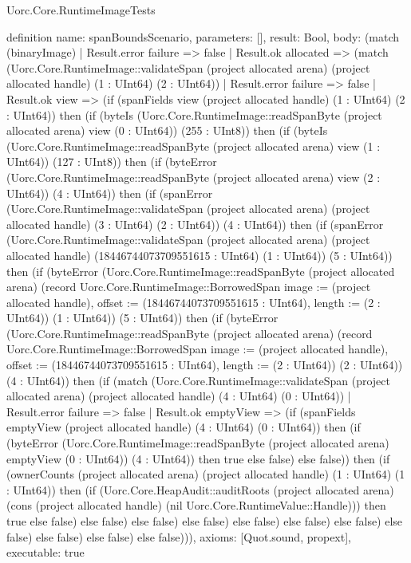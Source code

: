\begin{lexlean}{Uorc.Core.RuntimeImageTests}
\begin{semanticmodule}
definition{
  name: spanBoundsScenario,
  parameters: [],
  result: Bool,
  body: (match (binaryImage)
    | Result.error failure => false
    | Result.ok allocated => (match (Uorc.Core.RuntimeImage::validateSpan (project allocated arena) (project allocated handle) (1 : UInt64) (2 : UInt64))
      | Result.error failure => false
      | Result.ok view => (if (spanFields view (project allocated handle) (1 : UInt64) (2 : UInt64)) then (if (byteIs (Uorc.Core.RuntimeImage::readSpanByte (project allocated arena) view (0 : UInt64)) (255 : UInt8)) then (if (byteIs (Uorc.Core.RuntimeImage::readSpanByte (project allocated arena) view (1 : UInt64)) (127 : UInt8)) then (if (byteError (Uorc.Core.RuntimeImage::readSpanByte (project allocated arena) view (2 : UInt64)) (4 : UInt64)) then (if (spanError (Uorc.Core.RuntimeImage::validateSpan (project allocated arena) (project allocated handle) (3 : UInt64) (2 : UInt64)) (4 : UInt64)) then (if (spanError (Uorc.Core.RuntimeImage::validateSpan (project allocated arena) (project allocated handle) (18446744073709551615 : UInt64) (1 : UInt64)) (5 : UInt64)) then (if (byteError (Uorc.Core.RuntimeImage::readSpanByte (project allocated arena) (record Uorc.Core.RuntimeImage::BorrowedSpan {image := (project allocated handle), offset := (18446744073709551615 : UInt64), length := (2 : UInt64)}) (1 : UInt64)) (5 : UInt64)) then (if (byteError (Uorc.Core.RuntimeImage::readSpanByte (project allocated arena) (record Uorc.Core.RuntimeImage::BorrowedSpan {image := (project allocated handle), offset := (18446744073709551615 : UInt64), length := (2 : UInt64)}) (2 : UInt64)) (4 : UInt64)) then (if (match (Uorc.Core.RuntimeImage::validateSpan (project allocated arena) (project allocated handle) (4 : UInt64) (0 : UInt64))
        | Result.error failure => false
        | Result.ok emptyView => (if (spanFields emptyView (project allocated handle) (4 : UInt64) (0 : UInt64)) then (if (byteError (Uorc.Core.RuntimeImage::readSpanByte (project allocated arena) emptyView (0 : UInt64)) (4 : UInt64)) then true else false) else false)) then (if (ownerCounts (project allocated arena) (project allocated handle) (1 : UInt64) (1 : UInt64)) then (if (Uorc.Core.HeapAudit::auditRoots (project allocated arena) (cons (project allocated handle) (nil Uorc.Core.RuntimeValue::Handle))) then true else false) else false) else false) else false) else false) else false) else false) else false) else false) else false) else false))),
  axioms: [Quot.sound, propext],
  executable: true
}


\end{semanticmodule}
\end{lexlean}
